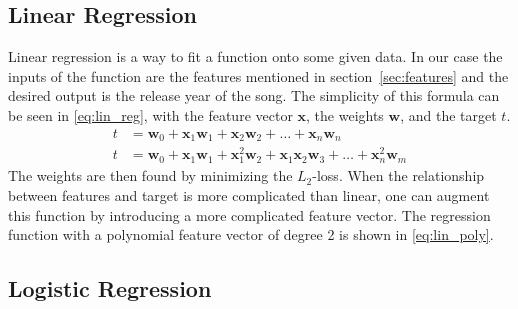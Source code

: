 \documentclass{article}
\begin{document}
\subsection{Linear Regression}\label{sec:lin_reg}
Linear regression is a way to fit a function onto some given data. In our case the inputs of the function are the features mentioned in section~\ref{sec:features} and the desired output is the release year of the song.
The simplicity of this formula can be seen in \eqref{eq:lin_reg}, with the feature vector $\boldsymbol{x}$, the weights $\boldsymbol{w}$, and the target $t$.
\begin{align}
  t &= \boldsymbol{w}_0 + \boldsymbol{x}_1\boldsymbol{w}_1 + \boldsymbol{x}_2\boldsymbol{w}_2 + \dots + \boldsymbol{x}_n\boldsymbol{w}_n \label{eq:lin_reg}
  \\
  t &= \boldsymbol{w}_0 + \boldsymbol{x}_1\boldsymbol{w}_{1} + \boldsymbol{x}_1^2\boldsymbol{w}_{2} + \boldsymbol{x}_1\boldsymbol{x}_2\boldsymbol{w}_{3} + \dots + \boldsymbol{x}_n^2\boldsymbol{w}_m \label{eq:lin_poly}
\end{align}
The weights are then found by minimizing the $L_2$-loss.
When the relationship between features and target is more complicated than linear, one can augment this function by introducing a more complicated feature vector. The regression function with a polynomial feature vector of degree 2 is shown in \eqref{eq:lin_poly}.


\subsection{Logistic Regression}\label{sec:log_reg}
\end{document}
